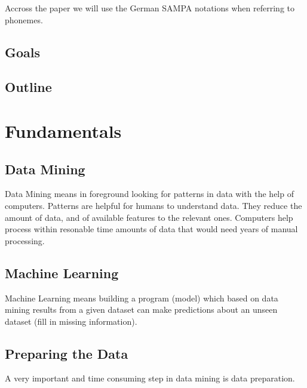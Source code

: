\documentclass[a4paper]{scrreprt}
\begin{document}
Accross the paper we will use the German SAMPA notations when referring to phonemes.
\section{Goals}
\section{Outline}

\chapter{Fundamentals}
\section{Data Mining}
Data Mining means in foreground looking for patterns in data with the help of computers. Patterns are helpful for humans to understand data. They reduce the amount of data, and of available features to the relevant ones. Computers help process within resonable time amounts of data that would need years of manual processing.
\section{Machine Learning}
Machine Learning means building a program (model) which based on data mining results from a given dataset can make predictions about an unseen dataset  (fill in missing information). 
\section{Preparing the Data}
A very important and time consuming step in data mining is data preparation. 
\end{document}
